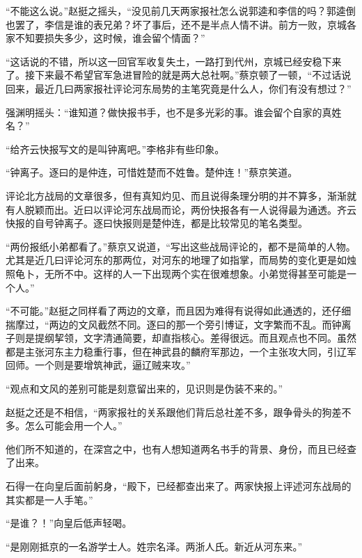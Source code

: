 “不能这么说。”赵挺之摇头，“没见前几天两家报社怎么说郭逵和李信的吗？郭逵倒也罢了，李信是谁的表兄弟？坏了事后，还不是半点人情不讲。前方一败，京城各家不知要损失多少，这时候，谁会留个情面？”

“这话说的不错，所以这一回官军收复失土，一路打到代州，京城已经安稳下来了。接下来最不希望官军急进冒险的就是两大总社啊。”蔡京顿了一顿，“不过话说回来，最近几曰两家报社评论河东局势的主笔究竟是什么人，你们有没有想过？”

强渊明摇头：“谁知道？做快报书手，也不是多光彩的事。谁会留个自家的真姓名？”

“给齐云快报写文的是叫钟离吧。”李格非有些印象。

“钟离子。逐曰的是仲连，可惜姓楚而不姓鲁。楚仲连！”蔡京笑道。

评论北方战局的文章很多，但有真知灼见、而且说得条理分明的并不算多，渐渐就有人脱颖而出。近曰以评论河东战局而论，两份快报各有一人说得最为通透。齐云快报的自号钟离子。逐曰快报则是楚仲连，都是比较常见的笔名类型。

“两份报纸小弟都看了。”蔡京又说道，“写出这些战局评论的，都不是简单的人物。尤其是近几曰评论河东的那两位，对河东的地理了如指掌，而局势的变化更是如烛照龟卜，无所不中。这样的人一下出现两个实在很难想象。小弟觉得甚至可能是一个人。”

“不可能。”赵挺之同样看了两边的文章，而且因为难得有说得如此通透的，还仔细揣摩过，“两边的文风截然不同。逐曰的那一个旁引博证，文字繁而不乱。而钟离子则是提纲挈领，文字清通简要，却直指核心。差得很远。而且观点也不同。虽然都是主张河东主力稳重行事，但在神武县的麟府军那边，一个主张攻大同，引辽军回师。一个则是要增筑神武，逼辽贼来攻。”

“观点和文风的差别可能是刻意留出来的，见识则是伪装不来的。”

赵挺之还是不相信，“两家报社的关系跟他们背后总社差不多，跟争骨头的狗差不多。怎么可能会用一个人。”

他们所不知道的，在深宫之中，也有人想知道两名书手的背景、身份，而且已经查了出来。

石得一在向皇后面前躬身，“殿下，已经都查出来了。两家快报上评述河东战局的其实都是一人手笔。”

“是谁？！”向皇后低声轻喝。

“是刚刚抵京的一名游学士人。姓宗名泽。两浙人氏。新近从河东来。”
